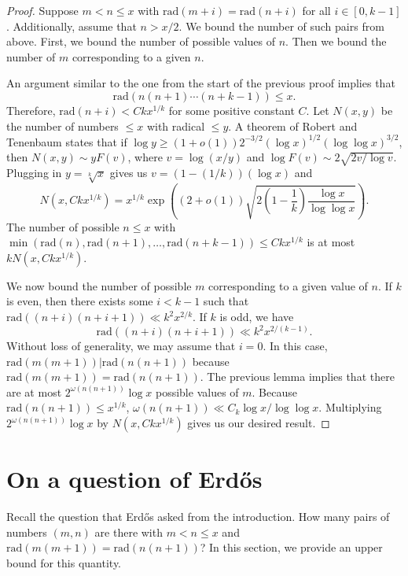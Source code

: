 \documentclass{article}
\theoremstyle{plain}
\theoremstyle{definition}
\begin{document}
\begin{proof} Suppose $m < n \leq x$ with $\textrm{rad} (m + i) = \textrm{rad} (n + i)$ for all $i \in [0, k - 1]$. Additionally, assume that $n > x/2$. We bound the number of such pairs from above. First, we bound the number of possible values of $n$. Then we bound the number of $m$ corresponding to a given $n$.

An argument similar to the one from the start of the previous proof implies that
\[\textrm{rad} (n(n + 1) \cdots (n + k - 1)) \leq x.\]
Therefore, $\textrm{rad} (n + i) < Ckx^{1/k}$ for some positive constant $C$. Let $N(x, y)$ be the number of numbers $\leq x$ with radical $\leq y$. A theorem of Robert and Tenenbaum \cite[p. 208]{Te} states that if $\log y \geq (1 + o(1)) 2^{-3/2} (\log x)^{1/2} (\log \log x)^{3/2}$, then $N(x, y) \sim yF(v)$, where $v = \log(x/y)$ and $\log F(v) \sim 2\sqrt{2 v/\log v}$. Plugging in $y = \sqrt[k]{x}$ gives us $v = (1 - (1/k))(\log x)$ and
\[N(x, Ckx^{1/k}) = x^{1/k} \exp\left((2 + o(1)) \sqrt{2\left(1 - \frac{1}{k}\right)\frac{\log x}{\log \log x}}\right).\]
The number of possible $n \leq x$ with $\min(\textrm{rad} (n), \textrm{rad} (n + 1), \ldots, \textrm{rad} (n + k - 1)) \leq Ckx^{1/k}$ is at most $kN(x, Ckx^{1/k})$.

We now bound the number of possible $m$ corresponding to a given value of $n$. If $k$ is even, then there exists some $i < k - 1$ such that $\textrm{rad} ((n + i)(n + i + 1)) \ll k^2 x^{2/k}$. If $k$ is odd, we have
\[\textrm{rad} ((n + i)(n + i + 1)) \ll k^2 x^{2/(k - 1)}.\]
Without loss of generality, we may assume that $i = 0$. In this case, $\textrm{rad} (m(m + 1)) | \textrm{rad} (n(n + 1))$ because $\textrm{rad} (m(m + 1)) = \textrm{rad} (n(n + 1))$. The previous lemma implies that there are at most $2^{\omega(n(n + 1))} \log x$ possible values of $m$. Because $\textrm{rad} (n(n + 1)) \leq x^{1/k}$, $\omega(n(n + 1)) \ll C_k \log x/\log \log x$. Multiplying $2^{\omega(n(n + 1))} \log x$ by $N(x, Ckx^{1/k})$ gives us our desired result.
\end{proof}

\section{On a question of Erd{\H o}s}

Recall the question that Erd{\H o}s asked from the introduction. How many pairs of numbers $(m, n)$ are there with $m < n \leq x$ and $\textrm{rad} (m(m + 1)) = \textrm{rad} (n(n + 1))$? In this section, we provide an upper bound for this quantity.
\end{document}
